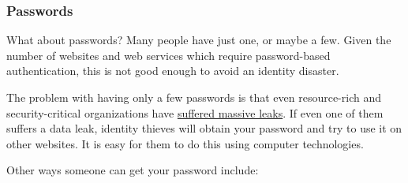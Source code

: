 \documentclass[
]{book}
\theoremstyle{definition}
\theoremstyle{definition}
\theoremstyle{definition}
\theoremstyle{definition}
\theoremstyle{remark}
\begin{document}
\hypertarget{passwords}{%
\subsubsection*{Passwords}\label{passwords}}

What about passwords? Many people have just one, or maybe a few. Given the number of websites and web services which require password-based authentication, this is not good enough to avoid an identity disaster.

The problem with having only a few passwords is that even resource-rich and security-critical organizations have \href{https://gizmodo.com.au/2017/05/over-560-million-passwords-discovered-in-anonymous-online-database/}{suffered massive leaks}. If even one of them suffers a data leak, identity thieves will obtain your password and try to use it on other websites. It is easy for them to do this using computer technologies.

Other ways someone can get your password include:
\end{document}
